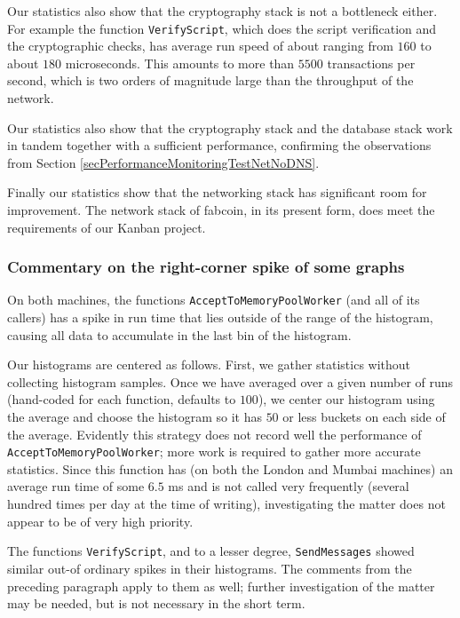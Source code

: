 \documentclass{article}
\begin{document}
Our statistics also show that the cryptography stack is not a bottleneck either. For example the function \verb|VerifyScript|, which does the script verification and the cryptographic checks, has average run speed of about ranging from $160$ to about $180$ microseconds. This amounts to more than $5500$ transactions per second, which is two orders of magnitude large than the throughput of the network.


Our statistics also show that the cryptography stack and the database stack work in tandem together with a sufficient performance, confirming the observations from Section \ref{secPerformanceMonitoringTestNetNoDNS}.

Finally our statistics show that the networking stack has significant room for improvement. The network stack of fabcoin, in its present form, does meet the requirements of our Kanban project.



\subsubsection{Commentary on the right-corner spike of some graphs}
On both machines, the functions \verb|AcceptToMemoryPoolWorker| (and all of its callers) has a spike in run time that lies outside of the range of the histogram, causing all data to accumulate in the last bin of the histogram. 

Our histograms are centered as follows. First, we gather statistics without collecting histogram samples. Once we have averaged over a given number of runs (hand-coded for each function, defaults to $100$), we center our histogram using the average and choose the histogram so it has $50$ or less buckets on each side of the average. Evidently this strategy does not record well the performance of  \verb|AcceptToMemoryPoolWorker|; more work is required to gather more accurate statistics. Since this function has (on both the London and Mumbai machines) an average run time of some $6.5$ ms and is not called very frequently (several hundred times per day at the time of writing), investigating the matter does not appear to be of very high priority. 


The functions \verb|VerifyScript|, and to a lesser degree, \verb|SendMessages| showed similar out-of ordinary spikes in their histograms. The comments from the preceding paragraph apply to them as well; further investigation of the matter may be needed, but is not necessary in the short term.
\end{document}
